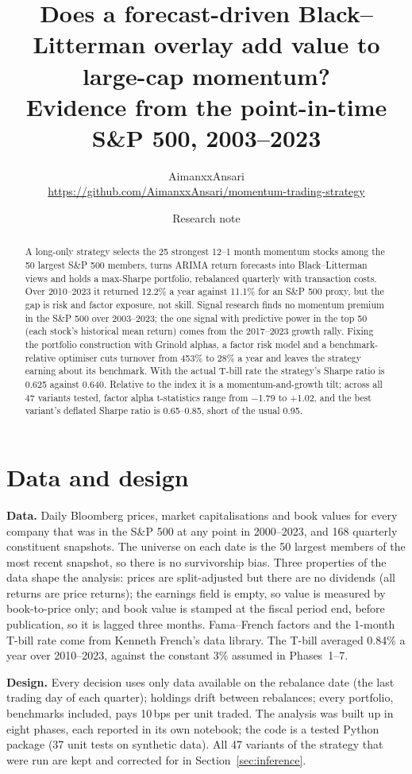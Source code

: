 \documentclass[10pt,a4paper]{article}
\title{\vspace{-1.2cm}\textbf{Does a forecast-driven Black--Litterman overlay add value to large-cap momentum?}\\[2pt]
\large Evidence from the point-in-time S\&P 500, 2003--2023}
\author{AimanxxAnsari\\\small\url{https://github.com/AimanxxAnsari/momentum-trading-strategy}}
\date{Research note}
\begin{document}
\maketitle
\vspace{-0.6cm}
\begin{abstract}
\noindent A long-only strategy selects the 25 strongest 12--1 month momentum stocks among the 50 largest S\&P 500
members, turns ARIMA return forecasts into Black--Litterman views and holds a max-Sharpe portfolio, rebalanced
quarterly with transaction costs. Over 2010--2023 it returned 12.2\% a year against 11.1\% for an
S\&P 500 proxy, but the gap is risk and factor exposure, not skill. Signal research finds no momentum premium in the
S\&P 500 over 2003--2023; the one signal with predictive power in the top 50 (each stock's historical mean return)
comes from the 2017--2023 growth rally. Fixing the portfolio construction with Grinold alphas, a factor risk model
and a benchmark-relative optimiser cuts turnover from 453\% to 28\% a year and leaves the strategy earning
about its benchmark. With the actual T-bill rate the strategy's Sharpe ratio is 0.625 against 0.640.
Relative to the index it is a momentum-and-growth tilt; across all 47 variants tested, factor alpha t-statistics
range from $-$1.79 to +1.02, and the best variant's deflated Sharpe ratio is 0.65--0.85,
short of the usual 0.95.
\end{abstract}

\section{Data and design}
\textbf{Data.} Daily Bloomberg prices, market capitalisations and book values for every company that was in the
S\&P 500 at any point in 2000--2023, and 168 quarterly constituent snapshots. The universe on each date is the 50
largest members of the most recent snapshot, so there is no survivorship bias. Three properties of the data shape
the analysis: prices are split-adjusted but there are no dividends (all returns are price returns); the earnings
field is empty, so value is measured by book-to-price only; and book value is stamped at the fiscal period end,
before publication, so it is lagged three months. Fama--French factors and the 1-month T-bill rate come from Kenneth
French's data library. The T-bill averaged 0.84\% a year over 2010--2023, against the constant 3\% assumed in
Phases~1--7.

\textbf{Design.} Every decision uses only data available on the rebalance date (the last trading day of each
quarter); holdings drift between rebalances; every portfolio, benchmarks included, pays 10\,bps per unit traded.
The analysis was built up in eight phases, each reported in its own notebook; the code is a tested Python package
(37 unit tests on synthetic data). All 47 variants of the strategy that were run are kept and corrected for in
Section~\ref{sec:inference}.
\end{document}
